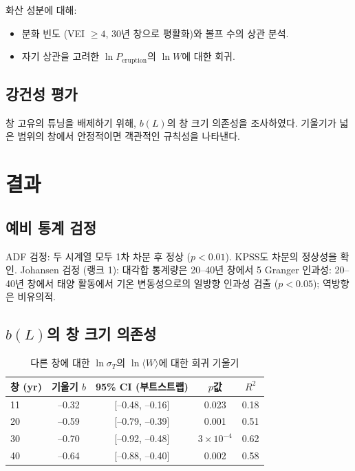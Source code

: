 \documentclass[11pt,a4paper]{article}
\begin{document}
	화산 성분에 대해:
	\begin{itemize}
		\item 분화 빈도 (VEI $\ge 4$, 30년 창으로 평활화)와 볼프 수의 상관 분석.
		\item 자기 상관을 고려한 $\ln P_{\text{eruption}}$의 $\ln W$에 대한 회귀.
	\end{itemize}
	
	\subsection{강건성 평가}
	
	창 고유의 튜닝을 배제하기 위해, $b(L)$의 창 크기 의존성을 조사하였다. 기울기가 넓은 범위의 창에서 안정적이면 객관적인 규칙성을 나타낸다.
	
	\section{결과}
	
	\subsection{예비 통계 검정}
	
	ADF 검정: 두 시계열 모두 1차 차분 후 정상 ($p < 0.01$). KPSS도 차분의 정상성을 확인.  
	Johansen 검정 (랭크 1): 대각합 통계량은 20–40년 창에서 5%
	Granger 인과성: 20–40년 창에서 태양 활동에서 기온 변동성으로의 일방향 인과성 검출 ($p < 0.05$); 역방향은 비유의적.
	
	\subsection{$b(L)$의 창 크기 의존성}
	
	\begin{table}[htbp]
		\centering
		\caption{다른 창에 대한 $\ln \sigma_T$의 $\ln \langle W \rangle$에 대한 회귀 기울기}
		\label{tab:slopes}
		\begin{tabular}{@{}lcccc@{}}
			\toprule
			창 (yr) & 기울기 $b$ & 95\% CI (부트스트랩) & $p$값 & $R^2$ \\
			\midrule
			11 & –0.32 & [–0.48, –0.16] & 0.023 & 0.18 \\
			20 & –0.59 & [–0.79, –0.39] & 0.001 & 0.51 \\
			30 & –0.70 & [–0.92, –0.48] & $3\times10^{-4}$ & 0.62 \\
			40 & –0.64 & [–0.88, –0.40] & 0.002 & 0.58 \\
			\bottomrule
		\end{tabular}
	\end{table}
	
\end{document}
